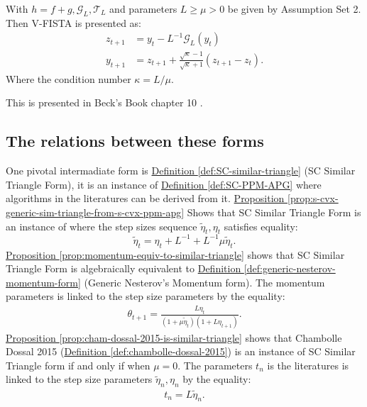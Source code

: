 \documentclass[12pt]{article}
\begin{document}
        \begin{definition}[V-FISTA]\label{def:v-fista}
            With $h = f + g, \mathcal G_L, \mathcal T_L$ and parameters $L \ge \mu > 0$  be given by Assumption Set 2. 
            Then V-FISTA is presented as: 
            \begin{align*}
                z_{t + 1} 
                &= y_t - L^{-1}\mathcal G_L(y_t)
                \\
                y_{t + 1} &= z_{t + 1} + 
                \frac{\sqrt{\kappa} - 1}{\sqrt{\kappa} + 1}
                (z_{t +1} - z_t). 
            \end{align*}
            Where the condition number $\kappa = L/\mu$. 
        \end{definition}
        \begin{remark}
            This is presented in Beck's Book chapter 10 \cite[(10.7.7)]{beck_first-order_nodate}. 
        \end{remark}

    \subsection{The relations between these forms}
        One pivotal intermadiate form is 
        \hyperref[def:SC-similar-triangle]
        { Definition \ref*{def:SC-similar-triangle}} 
        (SC Similar Triangle Form), it is an instance of
        \hyperref[def:SC-PPM-APG]
        {Definition \ref*{def:SC-PPM-APG}}
        where algorithms in the literatures can be derived from it. 
        \hyperref[prop:s-cvx-generic-sim-triangle-from-s-cvx-ppm-apg]
        {Proposition \ref*{prop:s-cvx-generic-sim-triangle-from-s-cvx-ppm-apg}}
        Shows that SC Similar Triangle Form is an instance of \SCPPMAPG where the step sizes sequence $\tilde \eta_t, \eta_t$ satisfies equality: 
        $$
            \tilde \eta_t =\eta_t + L^{-1} + L^{-1}\mu \tilde \eta_t. 
        $$
        \hyperref[prop:momentum-equiv-to-similar-triangle]
        {Proposition \ref*{prop:momentum-equiv-to-similar-triangle}}
        shows that SC Similar Triangle Form is algebraically equivalent to 
        \hyperref[def:generic-nesterov-momentum-form]{Definition \ref*{def:generic-nesterov-momentum-form}} (Generic Nesterov's Momentum form).
        The momentum parameters is linked to the step size parameters by the equality: 
        \begin{align*}
            \theta_{t + 1} = \frac{L\eta_t}{(1 + \mu \tilde\eta_{t})(1 + L\eta_{t + 1})}.
        \end{align*} 
        \hyperref[prop:cham-dossal-2015-is-similar-triangle]
        {Proposition \ref{prop:cham-dossal-2015-is-similar-triangle}}
        shows that Chambolle Dossal 2015 (\hyperref[def:chambolle-dossal-2015]
            {Definition \ref*{def:chambolle-dossal-2015}})
        is an instance of SC Similar Triangle form if and only if when $\mu = 0$. 
        The parameters $t_n$ is the literatures is linked to the step size parameters $\tilde \eta_n, \eta_n$ by the equality: 
        \begin{align*}
            t_n = L \tilde \eta_n. 
        \end{align*}
\end{document}
